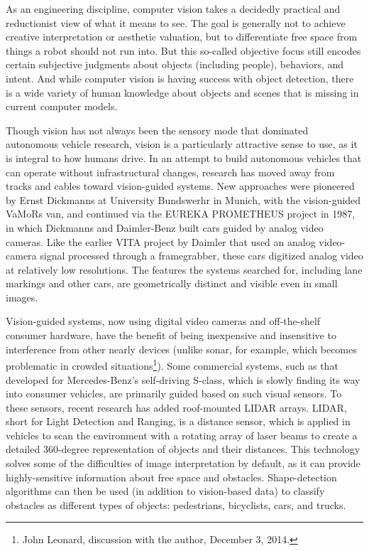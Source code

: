 As an engineering discipline, computer vision takes a decidedly
practical and reductionist view of what it means to see. The goal is
generally not to achieve creative interpretation or aesthetic
valuation, but to differentiate free space from things a robot should
not run into.\cite{???} But this so-called objective focus still encodes
certain subjective judgments about objects (including people),
behaviors, and intent. And while computer vision is having success
with object detection, there is a wide variety of human knowledge
about objects and scenes that is missing in current computer models.\cite{???}

Though vision has not always been the sensory mode that dominated
autonomous vehicle research, vision is a particularly attractive sense to
use, as it is integral to how humans drive. In an attempt to build
autonomous vehicles that can operate without infrastructural changes,
research has moved away from tracks and cables toward vision-guided
systems. New approaches were pioneered by Ernst Dickmanns at
University Bundswerhr in Munich, with the vision-guided VaMoRs van,
and continued via the EUREKA PROMETHEUS project in 1987, in which
Dickmanns and Daimler-Benz built cars guided by analog video
cameras.\cite{???} Like the earlier VITA project by Daimler that used an
analog video-camera signal processed through a framegrabber, these
cars digitized analog video at relatively low resolutions. The
features the systems searched for, including lane markings and other
cars, are geometrically distinct and visible even in small images.\cite{???}

Vision-guided systems, now using digital video cameras and
off-the-shelf consumer hardware, have the benefit of being inexpensive
and insensitive to interference from other nearly devices (unlike
sonar, for example, which becomes problematic in crowded
situations\footnote{John Leonard, discussion with the author, December
3, 2014.}). Some commercial systems, such as that developed for Mercedes-Benz's
self-driving S-class, which is slowly finding its way into consumer
vehicles, are primarily guided based on such visual sensors.\cite{???} To
these sensors, recent research has added roof-mounted LIDAR arrays.
LIDAR, short for Light Detection and Ranging, is a distance
sensor, which is applied in vehicles to scan the environment with a
rotating array of laser beams to create a detailed 360-degree
representation of objects and their distances. This technology
solves some of the difficulties of image interpretation by default, as
it can provide highly-sensitive information about free space and
obstacles. Shape-detection algorithms can then be used (in addition to
vision-based data) to classify obstacles as different types of
objects: pedestrians, bicyclists, cars, and trucks.\cite{???}

